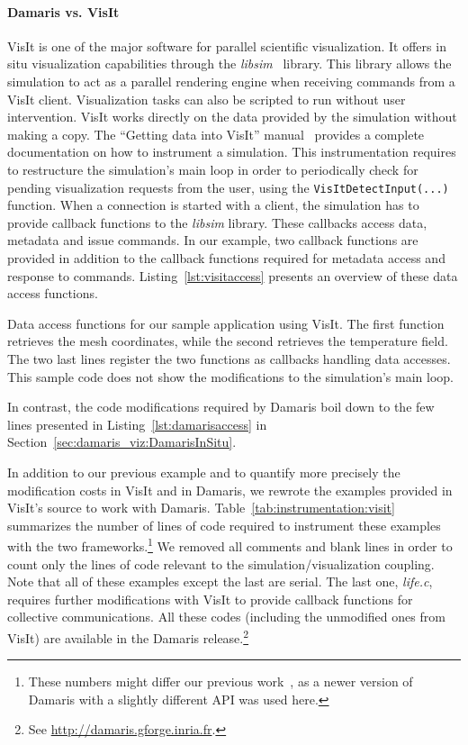 \paragraph{Damaris vs. VisIt}
VisIt is one of the major software for
parallel scientific visualization. It offers in situ visualization capabilities through the 
\emph{libsim}~\cite{whitlock2011parallel} library. This library allows the simulation 
to act as a parallel rendering engine when receiving commands from a VisIt client.
Visualization tasks can also be scripted to run 
without user intervention. VisIt works directly on the data provided by 
the simulation without making a copy. 
The ``Getting data into VisIt'' manual~\cite{gettingdataintovisit}
provides a complete documentation on how to instrument a simulation. This 
instrumentation requires to restructure the simulation's main loop in order to 
periodically check for pending visualization requests from the user, using the 
\texttt{VisItDetectInput(...)} function. When a connection is started with a 
client, the simulation has to provide callback functions to the \emph{libsim} 
library. These callbacks access data, metadata and issue commands. 
In our example, two callback functions are provided in addition to the callback 
functions required for metadata access and response to commands. 
Listing~\ref{lst:visitaccess} presents an overview of these data access functions.

\begin{Listing}[t]
	
	\caption[In situ data access functions using VisIt]{Data access functions 
	for our sample application using VisIt. The 
	first function retrieves the mesh coordinates, while the second retrieves 
	the temperature field. The two last lines register the two functions as 
	callbacks handling data accesses. This sample code does not show the 
	modifications to the simulation's main loop.}
	\label{lst:visitaccess}
\end{Listing}

In contrast, the code modifications required by Damaris boil down to the few
lines presented in Listing~\ref{lst:damarisaccess} in Section~\ref{sec:damaris_viz:DamarisInSitu}.

In addition to our previous example and to quantify more precisely the modification costs
in VisIt and in Damaris, we rewrote the examples provided in 
VisIt's source to work with Damaris. Table~\ref{tab:instrumentation:visit}
summarizes the number of lines of code required to instrument these examples 
with the two frameworks.\footnote{These numbers might differ our previous work~\cite{dorier2013damarisviz}, 
as a newer version of Damaris with a slightly different API was used here.} 
We removed all comments and blank lines in order to
count only the lines of code relevant to the simulation/visualization coupling. 
Note that all of these examples except the 
last are serial. The last one, \emph{life.c}, requires further 
modifications with VisIt to provide callback functions for collective communications.
All these codes (including the unmodified ones from VisIt) are available in the 
Damaris release.\footnote{See \url{http://damaris.gforge.inria.fr}.}

